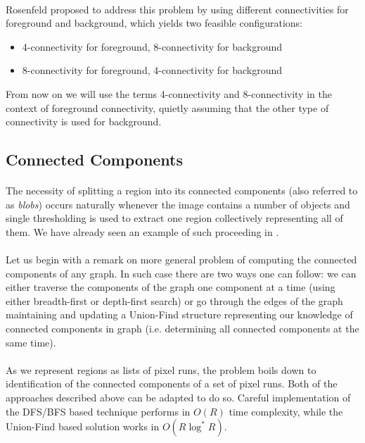 \paragraph*{}
Rosenfeld proposed\cite{Rosenfeld70} to address this problem by using different connectivities for foreground and background, which yields two feasible configurations:
\begin{itemize}
	\item 4-connectivity for foreground, 8-connectivity for background
	\item 8-connectivity for foreground, 4-connectivity for background
\end{itemize}
From now on we will use the terms 4-connectivity and 8-connectivity in the context of foreground connectivity, quietly assuming that the other type of connectivity is used for background.

\subsection{Connected Components}

\paragraph*{}
The necessity of splitting a region into its connected components (also referred to as \textit{blobs}) occurs naturally whenever the image contains a number of objects and single thresholding is used to extract one region collectively representing all of them. We have already seen an example of such proceeding in . 

\paragraph*{}
Let us begin with a remark on more general problem of computing the connected components of any graph. In such case there are two ways one can follow: we can either traverse the components of the graph one component at a time (using either breadth-first or depth-first search) or go through the edges of the graph maintaining and updating a Union-Find structure representing our knowledge of connected components in graph (i.e. determining all connected components at the same time).

\paragraph*{}
As we represent regions as lists of pixel runs, the problem boils down to identification of the connected components of a set of pixel runs. Both of the approaches described above can be adapted to do so. Careful implementation of the DFS/BFS based technique performs in $O(R)$ time complexity, while the Union-Find based solution works in $O(R\log^{*}R)$.

